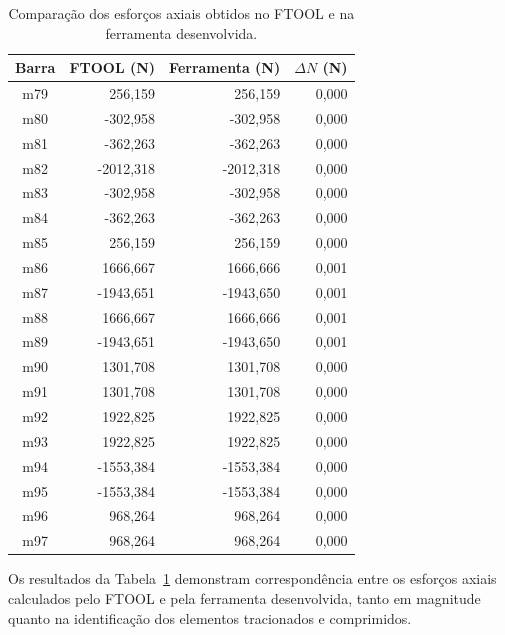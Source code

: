 \begin{table}[H]
    \centering
    \caption{Comparação dos esforços axiais obtidos no \acrshort{FTOOL} e na ferramenta desenvolvida.}
    \label{tab:comparacao-esforcos-axiais}
    \small
    \begin{tabular}{crrr}
        \hline
        \textbf{Barra} &
        \textbf{FTOOL (N)} &
        \textbf{Ferramenta (N)} &
        \textbf{$\Delta N$ (N)} \\
        \hline
        m79 &  256,159 &  256,159 & 0,000 \\
        m80 & -302,958 & -302,958 & 0,000 \\
        m81 & -362,263 & -362,263 & 0,000 \\
        m82 & -2012,318 & -2012,318 & 0,000 \\
        m83 & -302,958 & -302,958 & 0,000 \\
        m84 & -362,263 & -362,263 & 0,000 \\
        m85 &  256,159 &  256,159 & 0,000 \\
        m86 &  1666,667 &  1666,666 & 0,001 \\
        m87 & -1943,651 & -1943,650 & 0,001 \\
        m88 &  1666,667 &  1666,666 & 0,001 \\
        m89 & -1943,651 & -1943,650 & 0,001 \\
        m90 &  1301,708 &  1301,708 & 0,000 \\
        m91 &  1301,708 &  1301,708 & 0,000 \\
        m92 &  1922,825 &  1922,825 & 0,000 \\
        m93 &  1922,825 &  1922,825 & 0,000 \\
        m94 & -1553,384 & -1553,384 & 0,000 \\
        m95 & -1553,384 & -1553,384 & 0,000 \\
        m96 &  968,264 &  968,264 & 0,000 \\
        m97 &  968,264 &  968,264 & 0,000 \\
        \hline
    \end{tabular}
\end{table}

Os resultados da Tabela~\ref{tab:comparacao-esforcos-axiais} demonstram correspondência entre os esforços axiais calculados pelo \acrshort{FTOOL} e pela ferramenta desenvolvida, tanto em magnitude quanto na identificação dos elementos tracionados e comprimidos.

